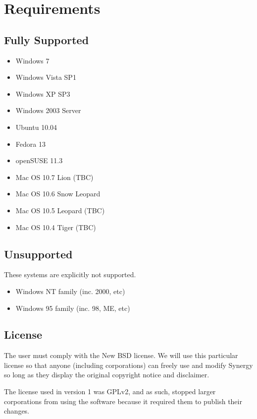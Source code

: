 \section{Requirements}

\subsection{Fully Supported}

\begin{itemize}
  \item Windows 7
  \item Windows Vista SP1
  \item Windows XP SP3
  \item Windows 2003 Server
  \item Ubuntu 10.04
  \item Fedora 13
  \item openSUSE 11.3
  \item Mac OS 10.7 Lion (TBC)
  \item Mac OS 10.6 Snow Leopard
  \item Mac OS 10.5 Leopard (TBC)
  \item Mac OS 10.4 Tiger (TBC)
\end{itemize}

\subsection{Unsupported}

These systems are explicitly not supported.

\begin{itemize}
  \item Windows NT family (inc. 2000, etc)
  \item Windows 95 family (inc. 98, ME, etc)
\end{itemize}

\subsection{License}

The user must comply with the New BSD license. We will use this particular 
license so that anyone (including corporations) can freely use and modify 
Synergy so long as they display the original copyright notice and disclaimer.

The license used in version 1 was GPLv2, and as such, stopped larger 
corporations from using the software because it required them to publish
their changes.

